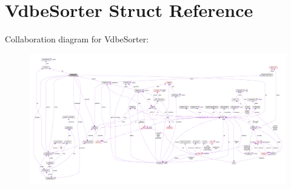 \hypertarget{structVdbeSorter}{}\section{Vdbe\+Sorter Struct Reference}
\label{structVdbeSorter}


Collaboration diagram for Vdbe\+Sorter\+:\nopagebreak
\begin{figure}[H]
\begin{center}
\leavevmode
\includegraphics[width=350pt]{structVdbeSorter__coll__graph}
\end{center}
\end{figure}

